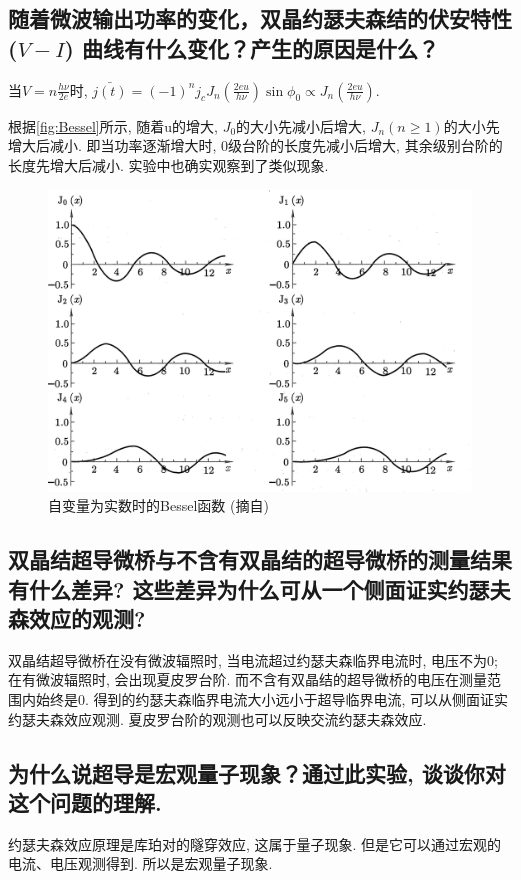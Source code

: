 \documentclass[font=default]{mpltx}
\begin{document}
\subsection{随着微波输出功率的变化，双晶约瑟夫森结的伏安特性 ($V-I$) 曲线有什么变化？产生的原因是什么？}
当$ V = n\frac{h\nu}{2e}$时, $\bar{j(t)} = (-1)^nj_cJ_n(\frac{2eu}{h\nu})\sin{\phi_0}\propto J_n(\frac{2eu}{h\nu})$.
\par
根据\autoref{fig:Bessel}所示, 随着u的增大, $J_0$的大小先减小后增大, $J_n (n\ge 1)$的大小先增大后减小. 即当功率逐渐增大时, 0级台阶的长度先减小后增大, 其余级别台阶的长度先增大后减小.
实验中也确实观察到了类似现象.
\begin{figure}
    \centering
    \includegraphics[width=0.85\linewidth]{fig/7.png}
    \caption{自变量为实数时的Bessel函数 (摘自\cite{shulifangfa})}
    \label{fig:Bessel}
\end{figure}

\subsection{双晶结超导微桥与不含有双晶结的超导微桥的测量结果有什么差异? 这些差异为什么可从一个侧面证实约瑟夫森效应的观测? }
双晶结超导微桥在没有微波辐照时, 当电流超过约瑟夫森临界电流时, 电压不为0; 在有微波辐照时, 会出现夏皮罗台阶. 而不含有双晶结的超导微桥的电压在测量范围内始终是0. 
得到的约瑟夫森临界电流大小远小于超导临界电流, 可以从侧面证实
约瑟夫森效应观测.
夏皮罗台阶的观测也可以反映交流约瑟夫森效应.


\subsection{为什么说超导是宏观量子现象？通过此实验, 谈谈你对这个问题的理解. }
约瑟夫森效应原理是库珀对的隧穿效应, 这属于量子现象. 但是它可以通过宏观的电流、电压观测得到. 所以是宏观量子现象.
\end{document}

